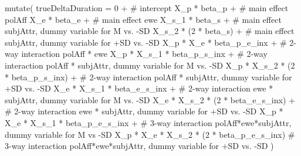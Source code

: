 \documentclass[
  letterpaper,
  DIV=11,
  numbers=noendperiod]{scrartcl}
\newenvironment{Shaded}{\begin{snugshade}}{\end{snugshade}}
\newcommand{\AttributeTok}[1]{\textcolor[rgb]{0.40,0.45,0.13}{#1}}
\newcommand{\CommentTok}[1]{\textcolor[rgb]{0.37,0.37,0.37}{#1}}
\newcommand{\DecValTok}[1]{\textcolor[rgb]{0.68,0.00,0.00}{#1}}
\newcommand{\FunctionTok}[1]{\textcolor[rgb]{0.28,0.35,0.67}{#1}}
\newcommand{\NormalTok}[1]{\textcolor[rgb]{0.00,0.23,0.31}{#1}}
\newcommand{\SpecialCharTok}[1]{\textcolor[rgb]{0.37,0.37,0.37}{#1}}
\begin{document}
\begin{Shaded}
\begin{Highlighting}[]
  \FunctionTok{mutate}\NormalTok{(}
    \AttributeTok{trueDeltaDuration =}
      \DecValTok{0} \SpecialCharTok{+}                                      \CommentTok{\# intercept}
\NormalTok{      X\_p }\SpecialCharTok{*}\NormalTok{ beta\_p }\SpecialCharTok{+}                           \CommentTok{\# main effect polAff}
\NormalTok{      X\_e }\SpecialCharTok{*}\NormalTok{ beta\_e }\SpecialCharTok{+}                           \CommentTok{\# main effect ewe}
\NormalTok{      X\_s\_1 }\SpecialCharTok{*}\NormalTok{ beta\_s }\SpecialCharTok{+}                         \CommentTok{\# main effect subjAttr, dummy variable for M vs. {-}SD}
\NormalTok{      X\_s\_2 }\SpecialCharTok{*}\NormalTok{ (}\DecValTok{2} \SpecialCharTok{*}\NormalTok{ beta\_s) }\SpecialCharTok{+}                   \CommentTok{\# main effect subjAttr, dummy variable for +SD vs. {-}SD}
\NormalTok{      X\_p }\SpecialCharTok{*}\NormalTok{ X\_e }\SpecialCharTok{*}\NormalTok{ beta\_p\_e\_inx }\SpecialCharTok{+}               \CommentTok{\# 2{-}way interaction polAff * ewe}
\NormalTok{      X\_p }\SpecialCharTok{*}\NormalTok{ X\_s\_1 }\SpecialCharTok{*}\NormalTok{ beta\_p\_s\_inx }\SpecialCharTok{+}             \CommentTok{\# 2{-}way interaction polAff * subjAttr, dummy variable for M vs. {-}SD}
\NormalTok{      X\_p }\SpecialCharTok{*}\NormalTok{ X\_s\_2 }\SpecialCharTok{*}\NormalTok{ (}\DecValTok{2} \SpecialCharTok{*}\NormalTok{ beta\_p\_s\_inx) }\SpecialCharTok{+}       \CommentTok{\# 2{-}way interaction polAff * subjAttr, dummy variable for +SD vs. {-}SD}
\NormalTok{      X\_e }\SpecialCharTok{*}\NormalTok{ X\_s\_1 }\SpecialCharTok{*}\NormalTok{ beta\_e\_s\_inx }\SpecialCharTok{+}             \CommentTok{\# 2{-}way interaction ewe * subjAttr, dummy variable for M vs. {-}SD}
\NormalTok{      X\_e }\SpecialCharTok{*}\NormalTok{ X\_s\_2 }\SpecialCharTok{*}\NormalTok{ (}\DecValTok{2} \SpecialCharTok{*}\NormalTok{ beta\_e\_s\_inx) }\SpecialCharTok{+}       \CommentTok{\# 2{-}way interaction ewe * subjAttr, dummy variable for +SD vs. {-}SD}
\NormalTok{      X\_p }\SpecialCharTok{*}\NormalTok{ X\_e }\SpecialCharTok{*}\NormalTok{ X\_s\_1 }\SpecialCharTok{*}\NormalTok{ beta\_p\_e\_s\_inx }\SpecialCharTok{+}     \CommentTok{\# 3{-}way interaction polAff*ewe*subjAttr, dummy variable for M vs {-}SD}
\NormalTok{      X\_p }\SpecialCharTok{*}\NormalTok{ X\_e }\SpecialCharTok{*}\NormalTok{ X\_s\_2 }\SpecialCharTok{*}\NormalTok{ (}\DecValTok{2} \SpecialCharTok{*}\NormalTok{ beta\_p\_e\_s\_inx) }\CommentTok{\# 3{-}way interaction polAff*ewe*subjAttr, dummy variable for +SD vs. {-}SD}
\NormalTok{  )}
\end{Highlighting}
\end{Shaded}
\end{document}

